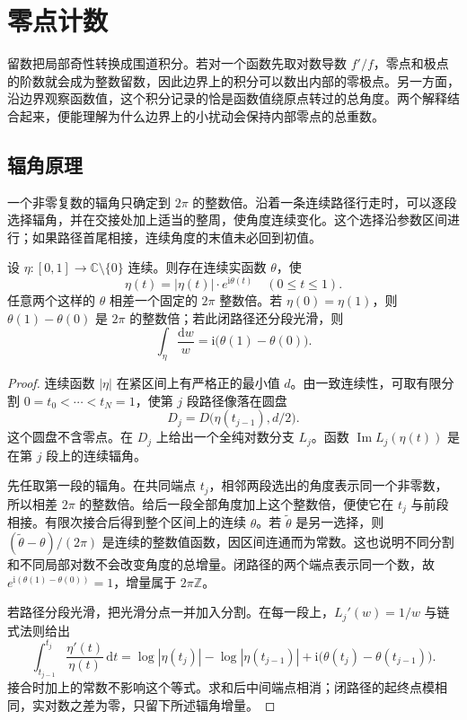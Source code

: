 \section{零点计数}
\label{b3:sec:0304}

留数把局部奇性转换成围道积分。若对一个函数先取对数导数 \(f'/f\)，零点和极点的阶数就会成为整数留数，因此边界上的积分可以数出内部的零极点。另一方面，沿边界观察函数值，这个积分记录的恰是函数值绕原点转过的总角度。两个解释结合起来，便能理解为什么边界上的小扰动会保持内部零点的总重数。

\subsection{辐角原理}
\label{b3:subsec:030401}

一个非零复数的辐角只确定到 \(2\pi\) 的整数倍。沿着一条连续路径行走时，可以逐段选择辐角，并在交接处加上适当的整周，使角度连续变化。这个选择沿参数区间进行；如果路径首尾相接，连续角度的末值未必回到初值。

\begin{lemma}[连续辐角]\label{b3:lem:03-continuous-argument}
设 \(\eta:[0,1]\to\mathbb C\setminus\{0\}\) 连续。则存在连续实函数 \(\theta\)，使
\[
 \eta(t)=|\eta(t)|\cdot e^{\mathrm{i}\theta(t)}
 \quad(0\le t\le1).
\]
任意两个这样的 \(\theta\) 相差一个固定的 \(2\pi\) 整数倍。若 \(\eta(0)=\eta(1)\)，则 \(\theta(1)-\theta(0)\) 是 \(2\pi\) 的整数倍；若此闭路径还分段光滑，则
\[
 \int_\eta\frac{\mathrm{d}w}{w}
 =\mathrm{i}\bigl(\theta(1)-\theta(0)\bigr).
\]
\end{lemma}
\begin{proof}
连续函数 \(|\eta|\) 在紧区间上有严格正的最小值 \(d\)。由一致连续性，可取有限分割 \(0=t_0<\cdots<t_N=1\)，使第 \(j\) 段路径像落在圆盘
\[
 D_j=D\bigl(\eta(t_{j-1}),d/2\bigr).
\]
这个圆盘不含零点。在 \(D_j\) 上给出一个全纯对数分支 \(L_j\)。函数
\(\operatorname{Im}L_j(\eta(t))\)
是在第 \(j\) 段上的连续辐角。

先任取第一段的辐角。在共同端点 \(t_j\)，相邻两段选出的角度表示同一个非零数，所以相差 \(2\pi\) 的整数倍。给后一段全部角度加上这个整数倍，便使它在 \(t_j\) 与前段相接。有限次接合后得到整个区间上的连续 \(\theta\)。若 \(\widetilde\theta\) 是另一选择，则 \((\widetilde\theta-\theta)/(2\pi)\) 是连续的整数值函数，因区间连通而为常数。这也说明不同分割和不同局部对数不会改变角度的总增量。闭路径的两个端点表示同一个数，故 \(e^{\mathrm{i}(\theta(1)-\theta(0))}=1\)，增量属于 \(2\pi\mathbb Z\)。

若路径分段光滑，把光滑分点一并加入分割。在每一段上，\(L_j'(w)=1/w\) 与链式法则给出
\[
 \int_{t_{j-1}}^{t_j}\frac{\eta'(t)}{\eta(t)}\,\mathrm{d}t
 =\log|\eta(t_j)|-\log|\eta(t_{j-1})|
   +\mathrm{i}\bigl(\theta(t_j)-\theta(t_{j-1})\bigr).
\]
接合时加上的常数不影响这个等式。求和后中间端点相消；闭路径的起终点模相同，实对数之差为零，只留下所述辐角增量。
\end{proof}

